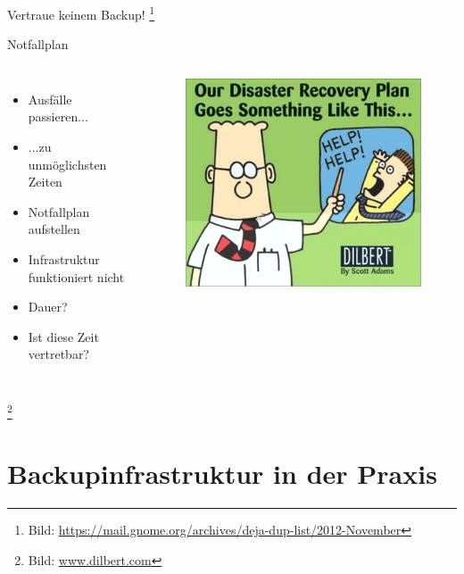 \documentclass[10pt]{beamer}
\newcommand\blfootnote[1]{%
	\begingroup
	\renewcommand\thefootnote{}\footnote{#1}%
	\addtocounter{footnote}{-1}%
	\endgroup
}
\begin{document}
\begin{frame}[fragile]{Vertraue keinem Backup!}
\blfootnote{Bild: \href{https://mail.gnome.org/archives/deja-dup-list/2012-November/}{https://mail.gnome.org/archives/deja-dup-list/2012-November}}
\end{frame}

%
%
\begin{frame}[fragile]{Notfallplan}
\begin{columns}[T,c,onlytextwidth]
	\begin{itemize}
		\item Ausfälle passieren...
		\item ...zu unmöglichsten Zeiten
		\item Notfallplan aufstellen
		\item Infrastruktur funktioniert nicht
		\item Dauer?
		\item Ist diese Zeit vertretbar?
	\end{itemize}
	\begin{figure}
		\includegraphics[width=1\textwidth]{images/dilbert}
	\end{figure}
\end{columns}

\blfootnote{Bild: \href{https://www.dilbert.com}{www.dilbert.com}}
\end{frame}

\section{Backupinfrastruktur in der Praxis}
\end{document}
